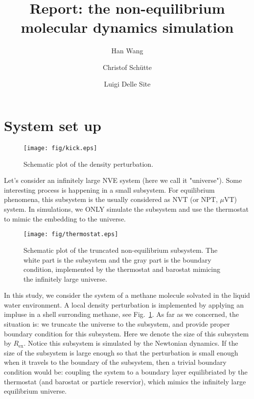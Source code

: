 \documentclass[aip,jcp,a4paper,reprint,onecolumn]{revtex4-1}
\newcommand{\ex}{{\textrm{ex}}}
\begin{document}
\title{Report: the non-equilibrium molecular dynamics simulation}
\author{Han Wang}
\author{Christof Sch\"utte}
\author{Luigi Delle Site}

\begin{abstract}
\end{abstract}

\maketitle

\newpage

\section{System set up}

\begin{figure}
  \centering
  \texttt{[image: fig/kick.eps]}
  \caption{Schematic plot of the density perturbation.}
  \label{fig:tmp1}
\end{figure}

Let's consider an infinitely large NVE system (here we call it
"universe"). Some interesting process is happening in a small subsystem. For
equilibrium phenomena, this subsystem is the usually considered as NVT
(or NPT, $\mu$VT) system.
In simulations, we ONLY simulate the subsystem and
use the thermostat to mimic the embedding to the universe.

\begin{figure}
  \centering
  \texttt{[image: fig/thermostat.eps]}
  \caption{Schematic plot of the truncated non-equilibrium subsystem.
    The white part is the subsystem and the gray part is the boundary
    condition, implemented by the thermostat and barostat mimicing
    the infinitely large universe.}
  \label{fig:tmp2}
\end{figure}


In this study, we consider the system of a methane molecule solvated
in the liquid water environment. A local density perturbation is implemented
by applying an impluse  in a shell surronding methane, see Fig.~\ref{fig:tmp1}.
As far as we concerned, the situation is: we truncate the universe to the
subsystem, and provide proper boundary condition for this
subsystem.
Here we denote the size of this subsystem by $R_{\ex}$.
Notice this subsystem is simulated by the Newtonian
dynamics. If the size of the
subsystem is large enough so that the perturbation is
small enough when it travels to the boundary of the subsystem, then a
trivial boundary condition would be: coupling the system to a boundary
layer equilibriated by the thermostat (and barostat or particle reservior),
which mimics the infinitely large equilibrium universe.
\end{document}
